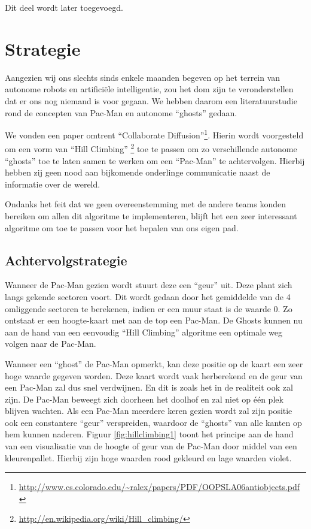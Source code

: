 \documentclass[12pt,a4paper]{report}
\begin{document}
Dit deel wordt later toegevoegd.

\chapter{Strategie}

Aangezien wij ons slechts sinds enkele maanden begeven op het terrein van autonome robots en artifici\"ele intelligentie, zou het dom zijn te veronderstellen dat er ons nog niemand is voor gegaan. We hebben daarom een literatuurstudie rond de concepten van Pac-Man en autonome ``ghosts'' gedaan.

We vonden een paper omtrent ``Collaborate Diffusion''\footnote{\url{http://www.cs.colorado.edu/~ralex/papers/PDF/OOPSLA06antiobjects.pdf}}. Hierin wordt voorgesteld om een vorm van ``Hill Climbing'' \footnote{\url{http://en.wikipedia.org/wiki/Hill_climbing/}} toe te passen om zo verschillende autonome ``ghosts'' toe te laten samen te werken om een ``Pac-Man'' te achtervolgen. Hierbij hebben zij geen nood aan bijkomende onderlinge communicatie naast de informatie over de wereld.

Ondanks het feit dat we geen overeenstemming met de andere teams konden bereiken om allen dit algoritme te implementeren, blijft het een zeer interessant algoritme om toe te passen voor het bepalen van ons eigen pad.

\section{Achtervolgstrategie}

Wanneer de Pac-Man gezien wordt stuurt deze een ``geur'' uit. Deze plant zich langs gekende sectoren voort. Dit wordt gedaan door het gemiddelde van de 4 omliggende sectoren te berekenen, indien er een muur staat is de waarde 0. Zo ontstaat er een hoogte-kaart met aan de top een Pac-Man. De Ghosts kunnen nu aan de hand van een eenvoudig ``Hill Climbing'' algoritme een optimale weg volgen naar de Pac-Man.

Wanneer een ``ghost'' de Pac-Man opmerkt, kan deze positie op de kaart een zeer hoge waarde gegeven worden. Deze kaart wordt vaak herberekend en de geur van een Pac-Man zal dus snel verdwijnen. En dit is zoals het in de realiteit ook zal zijn. De Pac-Man beweegt zich doorheen het doolhof en zal niet op \'e\'en plek blijven wachten. Als een Pac-Man meerdere keren gezien wordt zal zijn positie ook een constantere ``geur'' verspreiden, waardoor de ``ghosts'' van alle kanten op hem kunnen naderen. Figuur \ref{fig:hillclimbing1} toont het principe aan de hand van een visualisatie van de hoogte of geur van de Pac-Man door middel van een kleurenpallet. Hierbij zijn hoge waarden rood gekleurd en lage waarden violet.
\end{document}

